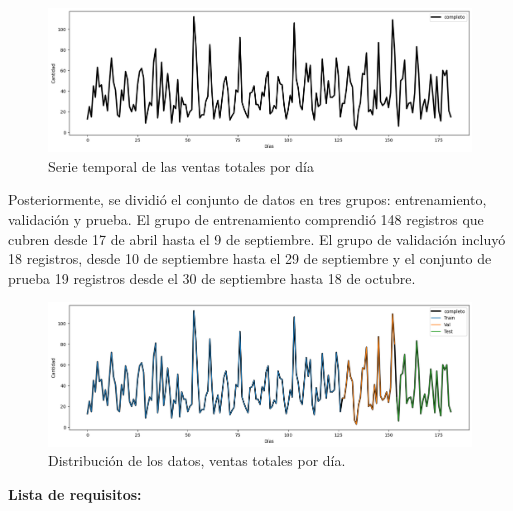 \begin{figure}[H]
  \begin{center}
    \includegraphics[scale=0.40]{./serie_normal_completa.png}
    \caption{Serie temporal de las ventas totales por día}
    \label{fig:serie_completa}
  \end{center}
\end{figure}

Posteriormente, se dividió el conjunto de datos en tres grupos: entrenamiento, validación y prueba. El grupo de entrenamiento comprendió 148 registros que cubren desde 17 de abril hasta el 9 de septiembre. El grupo de validación incluyó 18 registros, desde 10 de septiembre hasta el 29 de septiembre  y el conjunto de prueba 19 registros desde el 30 de septiembre hasta 18 de octubre.

\begin{figure}[H]
  \begin{center}
    \includegraphics[scale=0.40]{./serie_normal_dividida.png}
    \caption{Distribución de los datos, ventas totales por día.}
    \label{fig:distribucion_datos}
  \end{center}
\end{figure}

\textbf{Lista de requisitos:}

